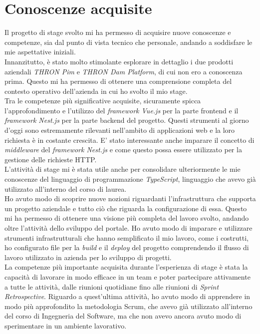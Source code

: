 \section{Conoscenze acquisite}
Il progetto di stage svolto mi ha permesso di acquisire nuove conoscenze e competenze, sia dal punto di vista tecnico che personale, andando a soddisfare le mie aspettative iniziali.\\
Innanzitutto, è stato molto stimolante esplorare in dettaglio i due prodotti aziendali \textit{THRON Pim} e \textit{THRON Dam Platform}, di cui non ero a conoscenza prima. 
Questo mi ha permesso di ottenere una comprensione completa del contesto operativo dell'azienda in cui ho svolto il mio stage.\\
Tra le competenze più significative acquisite, sicuramente spicca l'approfondimento e l'utilizzo del \textit{framework Vue.js} per la parte frontend e il \textit{framework Nest.js} per la parte backend del progetto.
Questi strumenti al giorno d'oggi sono estremamente rilevanti nell'ambito di applicazioni web e la loro richiesta è in costante crescita.
E' stato interessante anche imparare il concetto di \textit{middleware} del \textit{framework Nest.js} e come questo possa essere utilizzato per la gestione delle richieste HTTP.\\
L'attività di stage mi è stata utile anche per consolidare ulteriormente le mie conoscenze del linguaggio di programmazione \textit{TypeScript}, linguaggio che avevo già utilizzato all'interno del corso di laurea.\\
Ho avuto modo di scoprire nuove nozioni riguardanti l'infrastruttura che supporta un progetto aziendale e tutto ciò che riguarda la configurazione di essa. Questo mi ha permesso di ottenere una visione
più completa del lavoro svolto, andando oltre l'attività dello sviluppo del portale.
Ho avuto modo di imparare e utilizzare strumenti infrastrutturali che hanno semplificato il mio lavoro, come i costrutti, ho configurato file per la \textit{build} e il \textit{deploy} del progetto comprendendo il flusso di lavoro utilizzato in azienda per lo sviluppo di progetti.\\
La competenze più importante acquisita durante l'esperienza di stage è stata la capacità di lavorare in modo efficace in un team e poter partecipare attivamente a tutte le attività, dalle riunioni quotidiane fino alle riunioni di \textit{Sprint Retrospective}.
Riguardo a quest'ultima attività, ho avuto modo di apprendere in modo più approfondito la metodologia Scrum, che avevo già utilizzato all'interno del corso di Ingegneria del Software, ma che non avevo ancora avuto modo di sperimentare in un ambiente lavorativo.

